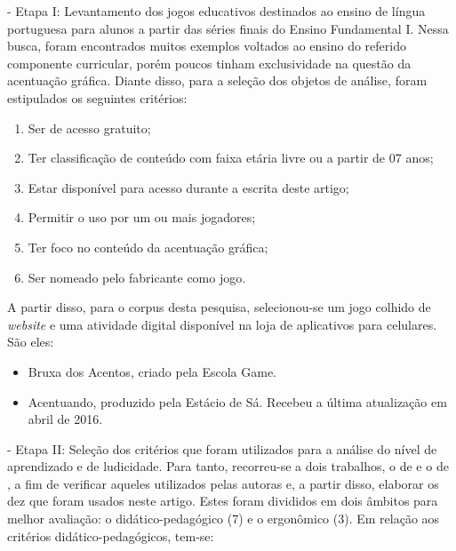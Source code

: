 \documentclass{textolivre}
\begin{document}
- Etapa I: Levantamento dos jogos educativos destinados ao ensino de língua portuguesa para alunos a partir das séries finais do Ensino Fundamental I. Nessa busca, foram encontrados muitos exemplos voltados ao ensino do referido componente curricular, porém poucos tinham exclusividade na questão da acentuação gráfica. Diante disso, para a seleção dos objetos de análise, foram estipulados os seguintes critérios:

\begin{enumerate}[label=\alph*]
    \item Ser de acesso gratuito;
    \item Ter classificação de conteúdo com faixa etária livre ou a partir de 07 anos;
    \item Estar disponível para acesso durante a escrita deste artigo;
    \item Permitir o uso por um ou mais jogadores;
    \item Ter foco no conteúdo da acentuação gráfica; 
    \item Ser nomeado pelo fabricante como jogo.
\end{enumerate}

A partir disso, para o corpus desta pesquisa, selecionou-se um jogo colhido de \emph{website} e uma atividade digital disponível na loja de aplicativos para celulares. São eles:

\begin{itemize}
    \item Bruxa dos Acentos, criado pela Escola Game.
    \item Acentuando, produzido pela Estácio de Sá. Recebeu a última atualização em abril de 2016.
\end{itemize} 

- Etapa II: Seleção dos critérios que foram utilizados para a análise do nível de aprendizado e de ludicidade. Para tanto, recorreu-se a dois trabalhos, o de \textcite{ribeiro2009} e o de \textcite{ribeiro2013}, a fim de verificar aqueles utilizados pelas autoras e, a partir disso, elaborar os dez que foram usados neste artigo. Estes foram divididos em dois âmbitos para melhor avaliação: o didático-pedagógico (7) e o ergonômico (3). Em relação aos critérios didático-pedagógicos, tem-se:
\end{document}
